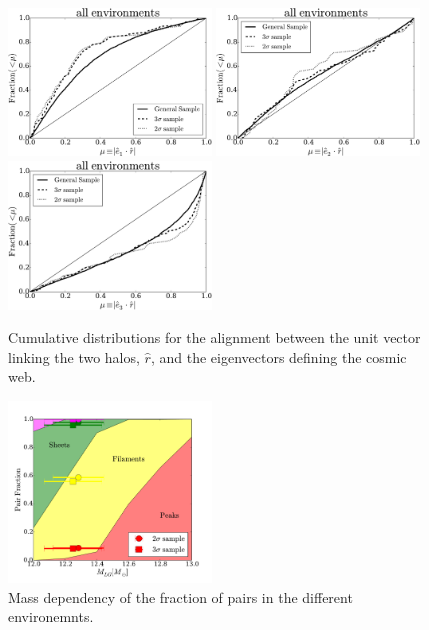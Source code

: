 \documentclass{emulateapj}
\begin{document}
\begin{figure}
\begin{center}
  \includegraphics[width=0.48\textwidth]{alignments_e1_r_all_environments.pdf} 
  \includegraphics[width=0.48\textwidth]{alignments_e2_r_all_environments.pdf} 
  \includegraphics[width=0.48\textwidth]{alignments_e3_r_all_environments.pdf} 
\end{center}
\caption{Cumulative distributions for the alignment between the unit
  vector linking the two halos, $\hat{r}$, and the eigenvectors
  defining the cosmic web.
    \label{fig:alignment_r}}  
\end{figure}


\begin{figure}
\begin{center}
  \includegraphics[width=0.48\textwidth]{median_mass_fraction.pdf} 
\caption{Mass dependency of the fraction of pairs in the different
  environemnts.
\label{fig:median_fraction}}
\end{center}
\end{figure}
\end{document}
